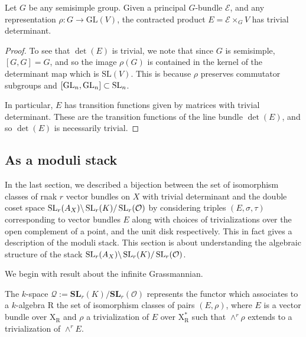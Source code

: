 \documentclass[12pt]{article}
\begin{document}
\begin{lemma}
    Let $G$ be any semisimple group. Given a principal $G$-bundle $\mathcal{E}$, and any representation $\rho : G \to \text{GL}(V)$, the contracted product $E = \mathcal{E} \times_G V$ has trivial determinant.
\end{lemma}

\begin{proof}
    To see that $\det(E)$ is trivial, we note that since $G$ is semisimple, $[G,G] = G$, and so the image $\rho(G)$ is contained in the kernel of the determinant map which is $\text{SL}(V)$. This is because $\rho$ preserves commutator subgroups and $[\operatorname{GL}_n, \operatorname{GL}_n] \subset \operatorname{SL}_n$.

    In particular, $E$ has transition functions given by matrices with trivial determinant. These are the transition functions of the line bundle $\det(E)$, and so $\det(E)$ is necessarily trivial.
\end{proof}

\subsection{As a moduli stack}
In the last section, we described a bijection between the set of isomorphism classes of rnak $r$ vector bundles on $X$ with trivial determinant and the double coset space $\operatorname{SL}_r(A_X) \backslash \operatorname{SL}_r(K) / \operatorname{SL}_r({\mathcal{O}})$ by considering triples $(E,\sigma,\tau)$ corresponding to vector bundles $E$ along with choices of trivializations over the open complement of a point, and the unit disk respectively. This in fact gives a description of the moduli stack. This section is about understanding the algebraic structure of the stack $\operatorname{SL}_r(A_X) \backslash \operatorname{SL}_r(K) / \operatorname{SL}_r({\mathcal{O}})$.

We begin with result about the infinite Grassmannian.
\begin{proposition}
    The $k$-space $\mathcal{Q} := \mathbf{SL}_r(K)/\mathbf{SL}_r(\mathcal{O})$ represents the functor which associates to a $k$-algebra $\textrm{R}$ the set of isomorphism classes of pairs $(E, \rho)$, where $E$ is a vector bundle over $\textrm{X}_{\textrm{R}}$ and $\rho$ a trivialization of $E$ over $\textrm{X}^*_{\textrm{R}}$ such that $\wedge^r \rho$ extends to a trivialization of $\wedge^r E$.
\end{proposition}
\end{document}
